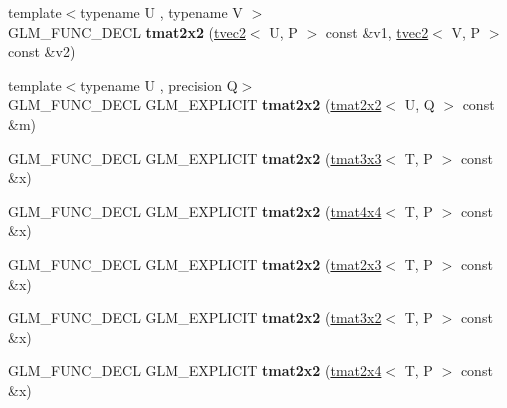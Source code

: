 \begin{DoxyCompactItemize}
\item 
\mbox{\label{structglm_1_1tmat2x2_ab910eb77d8f50dfa02ad062bb429e0a5}} 
{\footnotesize template$<$typename U , typename V $>$ }\\G\+L\+M\+\_\+\+F\+U\+N\+C\+\_\+\+D\+E\+CL {\bfseries tmat2x2} (\hyperlink{structglm_1_1tvec2}{tvec2}$<$ U, P $>$ const \&v1, \hyperlink{structglm_1_1tvec2}{tvec2}$<$ V, P $>$ const \&v2)
\item 
\mbox{\label{structglm_1_1tmat2x2_add527359c118148fb8984d4868e0dc7f}} 
{\footnotesize template$<$typename U , precision Q$>$ }\\G\+L\+M\+\_\+\+F\+U\+N\+C\+\_\+\+D\+E\+CL G\+L\+M\+\_\+\+E\+X\+P\+L\+I\+C\+IT {\bfseries tmat2x2} (\hyperlink{structglm_1_1tmat2x2}{tmat2x2}$<$ U, Q $>$ const \&m)
\item 
\mbox{\label{structglm_1_1tmat2x2_a21e814f61b4c8769f9e7ac36e531fc3a}} 
G\+L\+M\+\_\+\+F\+U\+N\+C\+\_\+\+D\+E\+CL G\+L\+M\+\_\+\+E\+X\+P\+L\+I\+C\+IT {\bfseries tmat2x2} (\hyperlink{structglm_1_1tmat3x3}{tmat3x3}$<$ T, P $>$ const \&x)
\item 
\mbox{\label{structglm_1_1tmat2x2_a8da598daa30e0df8eba907c63cff1e7a}} 
G\+L\+M\+\_\+\+F\+U\+N\+C\+\_\+\+D\+E\+CL G\+L\+M\+\_\+\+E\+X\+P\+L\+I\+C\+IT {\bfseries tmat2x2} (\hyperlink{structglm_1_1tmat4x4}{tmat4x4}$<$ T, P $>$ const \&x)
\item 
\mbox{\label{structglm_1_1tmat2x2_ac50ef056ce996b1af6066382eeb49a4f}} 
G\+L\+M\+\_\+\+F\+U\+N\+C\+\_\+\+D\+E\+CL G\+L\+M\+\_\+\+E\+X\+P\+L\+I\+C\+IT {\bfseries tmat2x2} (\hyperlink{structglm_1_1tmat2x3}{tmat2x3}$<$ T, P $>$ const \&x)
\item 
\mbox{\label{structglm_1_1tmat2x2_a06366377c97a00ee72ba66718ab92751}} 
G\+L\+M\+\_\+\+F\+U\+N\+C\+\_\+\+D\+E\+CL G\+L\+M\+\_\+\+E\+X\+P\+L\+I\+C\+IT {\bfseries tmat2x2} (\hyperlink{structglm_1_1tmat3x2}{tmat3x2}$<$ T, P $>$ const \&x)
\item 
\mbox{\label{structglm_1_1tmat2x2_ada3ffdd9349a053d27ffd29afa096618}} 
G\+L\+M\+\_\+\+F\+U\+N\+C\+\_\+\+D\+E\+CL G\+L\+M\+\_\+\+E\+X\+P\+L\+I\+C\+IT {\bfseries tmat2x2} (\hyperlink{structglm_1_1tmat2x4}{tmat2x4}$<$ T, P $>$ const \&x)

\end{DoxyCompactItemize}
